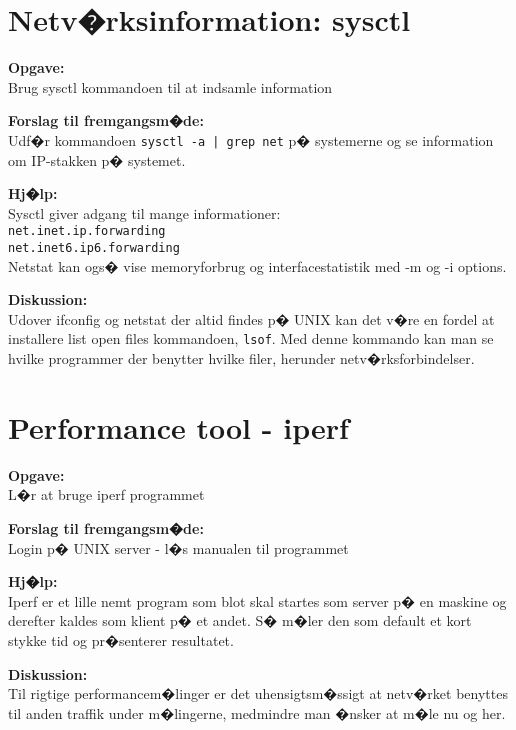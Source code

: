 \documentclass[a4paper,11pt,notitlepage]{oevelser}
\begin{document}
\chapter{Netv�rksinformation: sysctl}
\label{ex:sysctl}

{\bfseries Opgave:}\\
Brug sysctl kommandoen til at indsamle information

{\bfseries Forslag til fremgangsm�de:}\\
Udf�r kommandoen \verb+sysctl -a | grep net+ p� systemerne og
se information om IP-stakken p� systemet.

{\bfseries Hj�lp:}\\

Sysctl giver adgang til mange informationer:\\
\verb+net.inet.ip.forwarding+\\
\verb+net.inet6.ip6.forwarding+\\

Netstat kan ogs� vise memoryforbrug og interfacestatistik med -m og -i
options.

{\bfseries Diskussion:}\\
Udover ifconfig og netstat der altid findes p� UNIX kan det v�re en
fordel at installere list open files kommandoen, \verb+lsof+. Med
denne kommando kan man se hvilke programmer der benytter hvilke filer,
herunder netv�rksforbindelser.



\chapter{Performance tool - iperf}
\label{ex:iperf}

{\bfseries Opgave:} \\
L�r at bruge iperf programmet

{\bfseries Forslag til fremgangsm�de:} \\
Login p� UNIX server - l�s manualen til programmet

{\bfseries Hj�lp:} \\
Iperf er et lille nemt program som blot skal startes som server p� en maskine og derefter kaldes som klient p� et andet. S� m�ler den som default et kort stykke tid og pr�senterer resultatet.

{\bfseries Diskussion:}\\
Til rigtige performancem�linger er det uhensigtsm�ssigt at netv�rket benyttes til anden traffik under m�lingerne, medmindre man �nsker at m�le nu og her.
\end{document}
